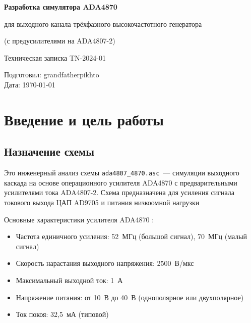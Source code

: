 \documentclass[a4paper, 12pt]{article}
\begin{document}
\begin{titlepage}
\centering
\vspace{0.75cm}
{\Huge\bfseries Разработка симулятора ADA4870\par}
\vspace{0.25cm}
{\Large для выходного канала трёхфазного высокочастотного генератора\par}
\vspace{0.25cm}
{\large (с предусилителями на ADA4807-2)\par}
\vspace{1.5cm}
{\large Техническая записка TN-2024-01\par}
\vspace{2cm}
\vfill
\begin{flushright}
Подготовил: grandfatherpikhto\\
Дата: \today
\end{flushright}
\vspace{1cm}
\end{titlepage}

\newpage
\tableofcontents
\newpage

\section{Введение и цель работы}

\subsection{Назначение схемы}

\par Это инженерный анализ схемы \texttt{ada4807\_4870.asc}~---
симуляции выходного каскада на основе операционного усилителя ADA4870
с предварительными усилителями тока ADA4807-2. Схема предназначена для
усиления сигнала токового выхода ЦАП AD9705 и питания низкоомной нагрузки

Основные характеристики усилителя ADA4870 \cite{ADA4870_ds}:
\begin{itemize}
  \item Частота единичного усиления: 52~МГц (большой сигнал),
        70~МГц (малый сигнал)
  \item Скорость нарастания выходного напряжения: 2500~В/мкс
  \item Максимальный выходной ток: 1~А
  \item Напряжение питания: от 10~В до 40~В (однополярное или
        двухполярное)
  \item Ток покоя: 32{,}5~мА (типовой)
\end{itemize}
\end{document}
